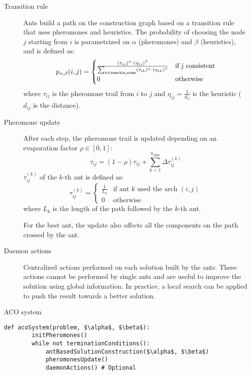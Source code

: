 \begin{description}
    \item[Transition rule] 
        Ants build a path on the construction graph based on a transition rule that uses pheromones and heuristics.
        The probability of choosing the node $j$ starting from $i$ 
        is parametrized on $\alpha$ (pheromones) and $\beta$ (heuristics), and is defined as:
        \[ p_{\alpha, \beta}(i, j) = \begin{cases}
            \frac{(\tau_{ij})^\alpha \cdot (\eta_{ij})^\beta}{\sum_{k \in \texttt{feasible\_nodes}} (\tau_{ik})^\alpha \cdot (\eta_{ik})^\beta} & \text{if } $j$ \text{ consistent} \\
            0 & \text{otherwise}
        \end{cases} \]
        where $\tau_{ij}$ is the pheromone trail from $i$ to $j$ and $\eta_{ij} = \frac{1}{d_{ij}}$ is the heuristic ($d_{ij}$ is the distance).

    \item[Pheromone update]
        After each step, the pheromone trail is updated depending on an evaporation factor $\rho \in [0, 1]$:
        \[ \tau_{ij} = (1 - \rho) \tau_{ij} + \sum_{k=1}^{n_\text{ants}} \Delta \tau_{ij}^{(k)} \]
        $\tau_{ij}^{(k)}$ of the $k$-th ant is defined as:
        \[ \tau_{ij}^{(k)} = \begin{cases}
            \frac{1}{L_k} & \text{if ant } k \text{ used the arch } (i, j) \\
            0 & \text{otherwise}
        \end{cases} \]
        where $L_k$ is the length of the path followed by the $k$-th ant.

        For the best ant, the update also affects all the components on the path crossed by the ant.

    \item[Daemon actions]
        Centralized actions performed on each solution built by the ants.
        These actions cannot be performed by single ants and are useful to improve the solution using global information.
        In practice, a local search can be applied to push the result towards a better solution.
\end{description} 

\begin{algorithm}
\caption{ACO system}
\begin{lstlisting}[mathescape=true]
    def acoSystem(problem, $\alpha$, $\beta$):
        initPheromones()
        while not terminationConditions():
            antBasedSolutionConstruction($\alpha$, $\beta$)
            pheromonesUpdate()
            daemonActions() # Optional
\end{lstlisting}
\end{algorithm}



